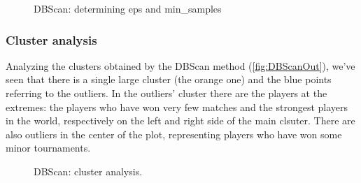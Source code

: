 \begin{figure}[H]
    \centering
    \caption{DBScan: determining eps and min\_samples}
    \label{fig:DBScanDist}
\end{figure}

\subsubsection{Cluster analysis}
Analyzing the clusters obtained by the DBScan method (\autoref{fig:DBScanOut}), we've seen that there is a single large cluster (the orange one) and the blue points referring to the outliers. In the outliers' cluster there are the players at the extremes: the players who have won very few matches and the strongest players in the world, respectively on the left and right side of the main clsuter. There are also outliers in the center of the plot, representing players who have won some minor tournaments.

\begin{figure}[H]
    \centering
    \caption{DBScan: cluster analysis.}
    \label{fig:DBScanOut}
\end{figure}

